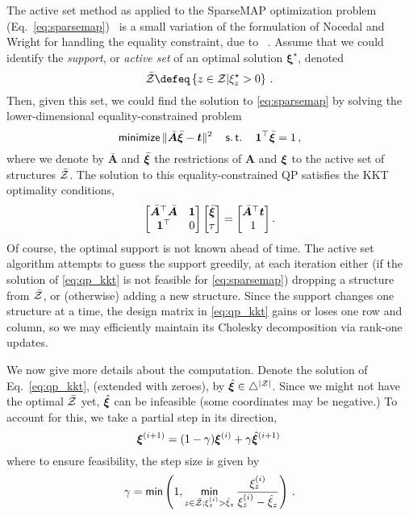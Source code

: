 The active set method
\citep[Chapters 16.4 \& 16.5]{nocedalwright} as applied to the SparseMAP
optimization problem (Eq.~\ref{eq:sparsemap})~\cite{niculae2018sparsemap}
is a small variation of the formulation of Nocedal and Wright for handling
the equality constraint, due to ~\citet[Section 6]{ad3}.
Assume that we could identify the \emph{support}, or
\emph{active set} of an optimal solution  $\bm{\xi}^\star$, denoted
\[\bar\ZZ \defeq \left\{z \in \ZZ |\xi^\star_z > 0\right\}\,. \]
Then, given this set, we could find the solution to \eqref{eq:sparsemap}
by solving the lower-dimensional equality-constrained problem
%
\begin{equation}
    \operatorname*{\mathsf{minimize}}\| \bar{\bm{A}}\bar{\bm{\xi}} - \bm{t} \|^2
    \quad\operatorname*{\mathsf{s.t.}}\quad\bm{1}^\top\bar{\bm{\xi}} = 1\,,
\end{equation}
%
where we denote by $\bar{\bm{A}}$ and $\bar{\bm{\xi}}$ the restrictions of $\bm{A}$
and $\bm{\xi}$ to the active set of structures $\bar{\mathcal{Z}}$.
The solution to this equality-constrained QP satisfies the KKT optimality
conditions,
%
\begin{equation}
    \label{eq:qp_kkt}
    \begin{bmatrix}
        {\bar{\bm{A}}}^\top \bar{\bm{A}} & \bm{1} \\
        \bm{1}^\top                      & 0      \\
    \end{bmatrix}
    \begin{bmatrix} \bar{\bm{\xi}} \\ \tau \end{bmatrix}
    =
    \begin{bmatrix} \bar{\bm{A}}^\top \bm{t} \\ 1 \end{bmatrix}.
\end{equation}
%
Of course, the optimal support is not known ahead of time. The active set
algorithm attempts to guess the support greedily,
at each iteration either (if the solution of \eqref{eq:qp_kkt} is not feasible
for \eqref{eq:sparsemap})
dropping a structure from $\bar{\mathcal{Z}}$, or (otherwise) adding a new structure.
Since the support changes one structure at a time, the design matrix in
\eqref{eq:qp_kkt} gains or loses one row and column, so
we may efficiently maintain its Cholesky decomposition via rank-one updates.

We now give more details about the computation.
Denote the solution of Eq.~\ref{eq:qp_kkt}, (extended with zeroes),
by $\hat{\bm{\xi}} \in \triangle^{|\mathcal{Z}|}$.
Since we might not have the optimal $\bar{\mathcal{Z}}$ yet, $\hat{\bm{\xi}}$ can be infeasible
(some coordinates may be negative.)
To account for this, we take a partial step in its direction,
%
\begin{equation}
    \bm{\xi}^{(i+1)} = (1-\gamma)\bm{\xi}^{(i)} + \gamma \hat{\bm{\xi}}^{(i+1)}\,
\end{equation}
%
where to ensure feasibility, the step size is given by
%
\begin{equation}\label{eq:step_size}
    \gamma = \operatorname*{\mathsf{min}} \left(1, \operatorname*{\mathsf{min}}_{z \in \bar{\mathcal{Z}}; \xi^{(i)}_z > \hat{\xi}_z}
    \frac{
        \xi^{(i)}_z
    }{
        \xi^{(i)}_z - \hat{\xi}_z}
    \right)\,.
\end{equation}

